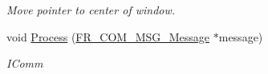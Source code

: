 \begin{DoxyCompactItemize}
\begin{DoxyCompactList}\small\item\em Move pointer to center of window. \item\end{DoxyCompactList}\item 
\hypertarget{classPlatform_1_1Window_1_1Linux_1_1Window_a66cd523949eb378935b881d2f4a55b03}{
void \hyperlink{classPlatform_1_1Window_1_1Linux_1_1Window_a66cd523949eb378935b881d2f4a55b03}{Process} (\hyperlink{structFramework_1_1Communication_1_1Message_1_1Message}{FR\_\-COM\_\-MSG\_\-Message} $\ast$message)}
\label{classPlatform_1_1Window_1_1Linux_1_1Window_a66cd523949eb378935b881d2f4a55b03}

\begin{DoxyCompactList}\small\item\em IComm \item\end{DoxyCompactList}\end{DoxyCompactItemize}

